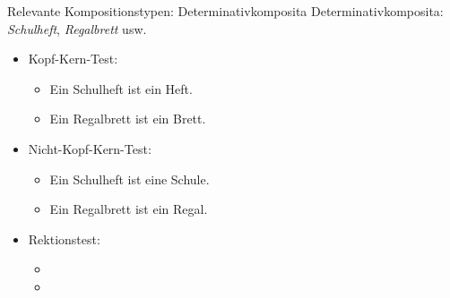 \begin{frame}
  {Relevante Kompositionstypen: Determinativkomposita}
  \onslide<+->
  Determinativkomposita: \textit{Schulheft}, \textit{Regalbrett} usw.
  \Halbzeile
  \begin{itemize}[<+->]
    \item Kopf-Kern-Test:
      \begin{itemize}[<+->]
        \item Ein Schulheft ist ein Heft. \Ck
        \item Ein Regalbrett ist ein Brett. \Ck
      \end{itemize}
    \item Nicht-Kopf-Kern-Test:
      \begin{itemize}[<+->]
        \item Ein Schulheft ist eine Schule. \Fl
        \item Ein Regalbrett ist ein Regal. \Fl
      \end{itemize}
      \Halbzeile
    \item Rektionstest:
      \begin{itemize}[<+->]
        \item {}
        \item {}
      \end{itemize}
  \end{itemize}
\end{frame}


